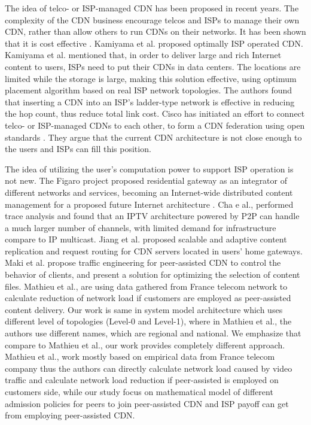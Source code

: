 \documentclass[JIP]{ipsj}
\begin{document}
The idea of telco- or ISP-managed CDN has been proposed in recent years.  
The complexity of the CDN business encourage telcos and ISPs to manage their own CDN, rather than allow others to run CDNs on their networks.  
It has been shown that it is cost effective \cite{federation}\cite{norton2011internet}. 
Kamiyama et al. \cite{NoriakiKAMIYAMA2013} proposed optimally ISP operated CDN.
Kamiyama et al. mentioned that, in order to deliver large and rich Internet content to users, ISPs need to put their CDNs in data centers.  
The locations are limited while the storage is large, making this solution effective, using optimum placement algorithm based on real ISP network topologies.  
The authors found that inserting a CDN into an ISP's ladder-type network is effective in reducing the hop count, thus reduce total link cost.  
Cisco has initiated an effort to connect telco- or ISP-managed CDNs to each other, to form a CDN federation \cite{federation} using open standards \cite{cdni}.  
They argue that the current CDN architecture is not close enough to the users and ISPs can fill this position.

The idea of utilizing the user's computation power to support ISP operation is not new.  The Figaro project \cite{figaro} proposed residential gateway as an integrator of different networks and services, becoming an Internet-wide distributed content management for a proposed future Internet architecture \cite{figaro}.  
Cha e al.,\cite{Cha:2008:NTP:1855641.1855646} performed trace analysis and found that an IPTV architecture powered by P2P can handle a much larger number of channels, with limited demand for infrastructure compare to IP multicast.  
Jiang et al. \cite{Jiang:2012:OMD:2413176.2413193} proposed scalable and adaptive content replication and request routing for CDN servers located in users' home gateways.  
Maki et al.\cite{NaoyaMAKI2012} propose traffic engineering for peer-assisted CDN to control the behavior of clients, and present a solution for optimizing the selection of content files.
Mathieu et al., \cite{6249305} are using data gathered from France telecom network to calculate reduction of network load if customers are employed as peer-assisted content delivery.
Our work is same in system model architecture which uses different level of topologies  (Level-0 and Level-1), where in Mathieu et al., \cite{6249305} the authors use different names, which are regional and national. 
We emphasize that compare to  Mathieu et al., \cite{6249305} our work provides completely different approach.
Mathieu et al., \cite{6249305} work mostly based on empirical data from France telecom company thus the authors can directly calculate network load caused by video traffic and calculate network load reduction if peer-assisted is employed on customers side,  while our study focus on mathematical model of different admission policies for peers to join peer-assisted CDN and ISP payoff can get from employing peer-assisted CDN.
\end{document}
